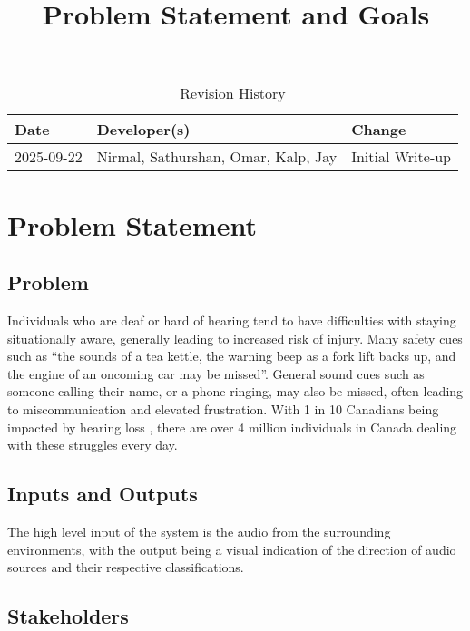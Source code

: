 \documentclass{article}
\title{Problem Statement and Goals\\\progname}
\author{\authname}
\date{}
\begin{document}
\maketitle

\begin{table}[hp]
\caption{Revision History} \label{TblRevisionHistory}
\begin{tabularx}{\textwidth}{llX}
\toprule
\textbf{Date} & \textbf{Developer(s)} & \textbf{Change}\\
\midrule
2025-09-22 & Nirmal, Sathurshan, Omar, Kalp, Jay & Initial Write-up\\
\bottomrule
\end{tabularx}
\end{table}

\newpage{}

\section{Problem Statement}

\subsection{Problem}

Individuals who are deaf or hard of hearing tend to have difficulties with
staying situationally aware, generally leading to increased risk of injury. Many
safety cues such as ``the sounds of a tea kettle, the warning beep as a fork lift
backs up, and the engine of an oncoming car may be missed''. \cite{Masterson2016}
General sound cues such as someone calling their name, or a phone ringing, may
also be missed, often leading to miscommunication and elevated frustration. With
1 in 10 Canadians being impacted by hearing loss \cite{Healthing2025}, there are
over 4 million individuals in Canada dealing with these struggles every day.


\subsection{Inputs and Outputs}

The high level input of the system is the audio from the surrounding
environments, with the output being a visual indication of the direction of
audio sources and their respective classifications.

\subsection{Stakeholders}
\end{document}
